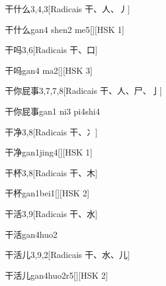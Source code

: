 \begin{entry}{干什么}{3,4,3}[Radicais ⼲、⼈、⼃]
  \begin{phonetics}{干什么}{gan4 shen2 me5}[][HSK 1]
  \end{phonetics}
\end{entry}

\begin{entry}{干吗}{3,6}[Radicais ⼲、⼝]
  \begin{phonetics}{干吗}{gan4 ma2}[][HSK 3]
  \end{phonetics}
\end{entry}

\begin{entry}{干你屁事}{3,7,7,8}[Radicais ⼲、⼈、⼫、⼅]
  \begin{phonetics}{干你屁事}{gan1 ni3 pi4shi4}
  \end{phonetics}
\end{entry}

\begin{entry}{干净}{3,8}[Radicais ⼲、⼎]
  \begin{phonetics}{干净}{gan1jing4}[][HSK 1]
  \end{phonetics}
\end{entry}

\begin{entry}{干杯}{3,8}[Radicais ⼲、⽊]
  \begin{phonetics}{干杯}{gan1bei1}[][HSK 2]
  \end{phonetics}
\end{entry}

\begin{entry}{干活}{3,9}[Radicais ⼲、⽔]
  \begin{phonetics}{干活}{gan4huo2}
  \end{phonetics}
\end{entry}

\begin{entry}{干活儿}{3,9,2}[Radicais ⼲、⽔、⼉]
  \begin{phonetics}{干活儿}{gan4huo2r5}[][HSK 2]
  \end{phonetics}
\end{entry}

